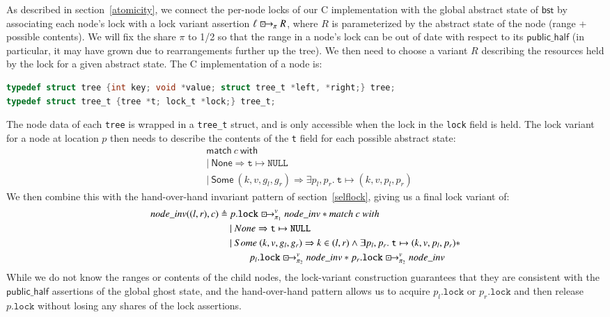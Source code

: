 \documentclass[a4paper,USenglish,cleveref, autoref, thm-restate]{lipics-v2021}
\newcommand{\islock}{\boxdotright}
\newcommand{\lockvar}{\islock^{v}}
\newcommand{\treerep}{\ensuremath{\mathsf{bst}}}
\begin{document}
As described in section~\ref{atomicity}, we connect the per-node locks of our C implementation with the global abstract state of $\treerep$ by associating each node's lock with a lock variant assertion $\ell \islock_\pi R$, where $R$ is parameterized by the abstract state of the node (range + possible contents). We will fix the share $\pi$ to 1/2 so that the range in a node's lock can be out of date with respect to its $\mathsf{public\_half}$ (in particular, it may have grown due to rearrangements further up the tree). We then need to choose a variant $R$ describing the resources held by the lock for a given abstract state. The C implementation of a node is:
\begin{lstlisting}[language = C,numbers = none]
typedef struct tree {int key; void *value; struct tree_t *left, *right;} tree;
typedef struct tree_t {tree *t; lock_t *lock;} tree_t;
\end{lstlisting}
The node data of each \lstinline{tree} is wrapped in a \lstinline{tree_t} struct, and is only accessible when the lock in the \lstinline{lock} field is held. The lock variant for a node at location $p$ then needs to describe the contents of the \lstinline{t} field for each possible abstract state:
\begin{align*}
&\mathsf{match}\ c\ \mathsf{with}\\
&|\ \mathsf{None} \Rightarrow \texttt{t} \mapsto \texttt{NULL}\\
&|\ \mathsf{Some}\ (k, v, g_l, g_r) \Rightarrow \exists p_l, p_r.\ \texttt{t} \mapsto (k, v, p_l, p_r)
\end{align*}
We then combine this with the hand-over-hand invariant pattern of section~\ref{selflock}, giving us a final lock variant of:
\begin{align*}
\mathsf{node\_inv}((l, r), c) \triangleq \ &p.\texttt{lock} \lockvar_{\pi_1} \mathsf{node\_inv} * \mathsf{match}\ c\ \mathsf{with}\\
&|\ \mathsf{None} \Rightarrow \texttt{t} \mapsto \texttt{NULL}\\
&|\ \mathsf{Some}\ (k, v, g_l, g_r) \Rightarrow k \in (l, r) \land \exists p_l, p_r.\ \texttt{t} \mapsto (k, v, p_l, p_r) * \\&\qquad p_l.\texttt{lock} \lockvar_{\pi_2} \mathsf{node\_inv} * p_r.\texttt{lock} \lockvar_{\pi_2} \mathsf{node\_inv}
\end{align*}
While we do not know the ranges or contents of the child nodes, the lock-variant construction guarantees that they are consistent with the $\mathsf{public\_half}$ assertions of the global ghost state, and the hand-over-hand pattern allows us to acquire $p_l.\texttt{lock}$ or $p_r.\texttt{lock}$ and then release $p.\texttt{lock}$ without losing any shares of the lock assertions.
\end{document}
